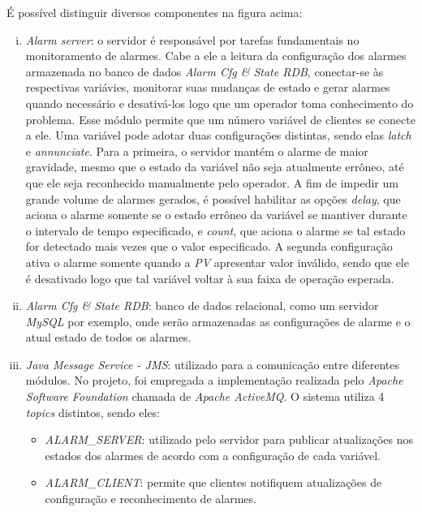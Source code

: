 É possível distinguir diversos componentes na figura acima:

\begin{enumerate}[i.]
  
  \item \textit{Alarm server}: o servidor é responsável por tarefas fundamentais
  no monitoramento de alarmes. Cabe a ele a leitura da configuração dos alarmes
  armazenada no banco de dados \textit{Alarm Cfg \& State RDB}, conectar-se às
  respectivas variávies, monitorar suas mudanças de estado e gerar alarmes
  quando necessário e desativá-los logo que um operador toma conhecimento
  do problema. Esse módulo permite que um número variável de clientes se conecte
  a ele. Uma variável pode adotar duas configurações distintas, sendo elas
  \textit{latch} e \textit{annunciate}. Para a primeira, o servidor mantém o
  alarme de maior gravidade, mesmo que o estado da variável não seja
  atualmente errôneo, até que ele seja reconhecido manualmente pelo operador.
  A fim de impedir um grande volume de alarmes gerados, é possível habilitar
  as opções \textit{delay}, que aciona o alarme somente se o estado errôneo da
  variável se mantiver durante o intervalo de tempo especificado, e
  \textit{count}, que aciona o alarme se tal estado for detectado mais vezes
  que o valor especificado. A segunda configuração ativa o alarme somente
  quando a \textit{PV} apresentar valor inválido, sendo que ele é desativado
  logo que tal variável voltar à sua faixa de operação esperada.
  
  \item \textit{Alarm Cfg \& State RDB}: banco de dados relacional, como um
  servidor \textit{MySQL} por exemplo, onde serão armazenadas as configurações
  de alarme e o atual estado de todos os alarmes.
  
  \item \textit{Java Message Service - JMS}: utilizado para a comunicação entre
  diferentes módulos. No projeto, foi empregada a implementação realizada pelo
  \textit{Apache Software Foundation} chamada de  \textit{Apache ActiveMQ}. O
  sistema utiliza 4 \textit{topics} distintos, sendo eles:
  
  \begin{itemize} \renewcommand\labelitemi{--}
    \item \textit{ALARM\_SERVER}: utilizado pelo servidor para publicar
    atualizações nos estados dos alarmes de acordo com a configuração de cada
    variável.
    
    \item \textit{ALARM\_CLIENT}: permite que clientes notifiquem atualizações
    de configuração e reconhecimento de alarmes.
    

\end{itemize}
\end{enumerate}
